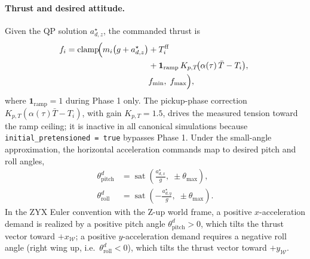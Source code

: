 \paragraph{Thrust and desired attitude.}
Given the QP solution $a_{d,z}^\star$, the commanded thrust is
\begin{align}
\label{eq:thrust}
  f_i = \operatorname{clamp}\!\Bigl(
      m_i\bigl(g + a_{d,z}^\star\bigr)
      &+ T_i^{\mathrm{ff}}\\
      &+ \mathbf{1}_{\mathrm{ramp}}\,
        K_{p,T}\!\bigl(\alpha(\tau)\,\bar{T} - T_i\bigr),\;\nonumber\\
      &f_{\min},\; f_{\max}
    \Bigr),\nonumber
\end{align}
where $\mathbf{1}_{\mathrm{ramp}} = 1$ during Phase 1 only. The pickup-phase correction $K_{p,T}(\alpha(\tau)\bar{T} - T_i)$, with gain $K_{p,T} = 1.5$, drives the measured tension toward the ramp ceiling; it is inactive in all canonical simulations because \texttt{initial\_pretensioned = true} bypasses Phase 1. Under the small-angle approximation, the horizontal acceleration commands map to desired pitch and roll angles,
\begin{align}
\label{eq:attitude-des}
  \theta_{\mathrm{pitch}}^d
    &= \operatorname{sat}\!\!\left(\frac{a_{d,x}^\star}{g},\;\pm\theta_{\max}\right),\\
  \theta_{\mathrm{roll}}^d
    &= \operatorname{sat}\!\!\left(-\frac{a_{d,y}^\star}{g},\;\pm\theta_{\max}\right).\nonumber
\end{align}
In the ZYX Euler convention with the Z-up world frame, a positive $x$-acceleration demand is realized by a positive pitch angle $\theta_{\mathrm{pitch}}^d > 0$, which tilts the thrust vector toward $+x_{\mathcal{W}}$; a positive $y$-acceleration demand requires a negative roll angle (right wing up, i.e.\ $\theta_{\mathrm{roll}}^d < 0$), which tilts the thrust vector toward $+y_{\mathcal{W}}$.

